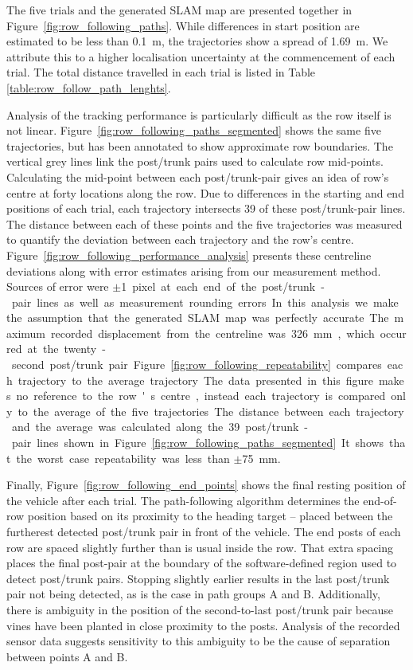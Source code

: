 \documentclass[preprint,authoryear,12pt]{elsarticle}
\begin{document}
    The five trials and the generated SLAM map are presented together in Figure~\ref{fig:row_following_paths}.
    While differences in start position are estimated to be less than \SI{0.1}{\meter}, the trajectories show a spread of \SI{1.69}{\meter}.
    We attribute this to a higher localisation uncertainty at the commencement of each trial.
    The total distance travelled in each trial is listed in Table \ref{table:row_follow_path_lenghts}.

    Analysis of the tracking performance is particularly difficult as the row itself is not linear.
    Figure~\ref{fig:row_following_paths_segmented} shows the same five trajectories, but has been annotated to show approximate row boundaries.
    The vertical grey lines link the post/trunk pairs used to calculate row mid-points.
    Calculating the mid-point between each post/trunk-pair gives an idea of row's centre at forty locations along the row.
    Due to differences in the starting and end positions of each trial, each trajectory intersects 39 of these post/trunk-pair lines.
    The distance between each of these points and the five trajectories was measured to quantify the deviation between each trajectory and the row's centre.
    Figure~\ref{fig:row_following_performance_analysis} presents these centreline deviations along with error estimates arising from our measurement method.
    Sources of error were $\pm$\SI{1} pixel at each end of the post/trunk-pair lines as well as measurement rounding errors.
    In this analysis we make the assumption that the generated SLAM map was perfectly accurate.
    The maximum recorded displacement from the centreline was \SI{326}{\milli\meter}, which occurred at the twenty-second post/trunk pair.

    Figure~\ref{fig:row_following_repeatability} compares each trajectory to the average trajectory.
    The data presented in this figure makes no reference to the row's centre, instead each trajectory is compared only to the average of the five trajectories.
    The distance between each trajectory and the average was calculated along the 39 post/trunk-pair lines shown in Figure~\ref{fig:row_following_paths_segmented}.
    It shows that the worst case repeatability was less than $\pm$\SI{75}{\milli\meter}.

    Finally, Figure~\ref{fig:row_following_end_points} shows the final resting position of the vehicle after each trial.
    The path-following algorithm determines the end-of-row position based on its proximity to the heading target -- placed between the furtherest detected post/trunk pair in front of the vehicle.
    The end posts of each row are spaced slightly further than is usual inside the row.
    That extra spacing places the final post-pair at the boundary of the software-defined region used to detect post/trunk pairs.
    Stopping slightly earlier results in the last post/trunk pair not being detected, as is the case in path groups A and B.
    Additionally, there is ambiguity in the position of the second-to-last post/trunk pair because vines have been planted in close proximity to the posts.
    Analysis of the recorded sensor data suggests sensitivity to this ambiguity to be the cause of separation between points A and B.
\end{document}
